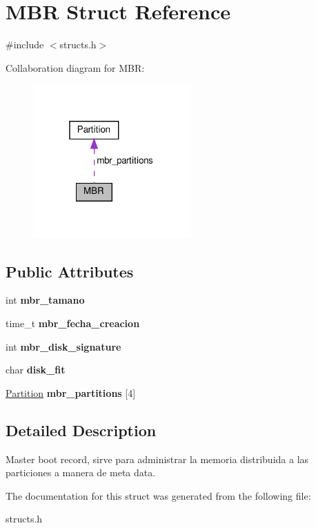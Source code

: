 \hypertarget{structMBR}{}\section{M\+BR Struct Reference}
\label{structMBR}


{\ttfamily \#include $<$structs.\+h$>$}



Collaboration diagram for M\+BR\+:
\nopagebreak
\begin{figure}[H]
\begin{center}
\leavevmode
\includegraphics[width=172pt]{structMBR__coll__graph}
\end{center}
\end{figure}
\subsection*{Public Attributes}
\begin{DoxyCompactItemize}
\item 
\mbox{\label{structMBR_a68ccdc40e66056adc16b4cad23264283}} 
int {\bfseries mbr\+\_\+tamano}
\item 
\mbox{\label{structMBR_a0c163e882325142b926667027d6b5546}} 
time\+\_\+t {\bfseries mbr\+\_\+fecha\+\_\+creacion}
\item 
\mbox{\label{structMBR_a42f72f0002351e20fbeeef14f56e4bc6}} 
int {\bfseries mbr\+\_\+disk\+\_\+signature}
\item 
\mbox{\label{structMBR_a984498f1082d2f067ae2acb5e9394c0c}} 
char {\bfseries disk\+\_\+fit}
\item 
\mbox{\label{structMBR_acd74d7b646ff5c0d2bdac6c001dc2129}} 
\hyperlink{structPartition}{Partition} {\bfseries mbr\+\_\+partitions} \mbox{[}4\mbox{]}
\end{DoxyCompactItemize}


\subsection{Detailed Description}
Master boot record, sirve para administrar la memoria distribuida a las particiones a manera de meta data. 

The documentation for this struct was generated from the following file\+:\begin{DoxyCompactItemize}
\item 
structs.\+h\end{DoxyCompactItemize}
